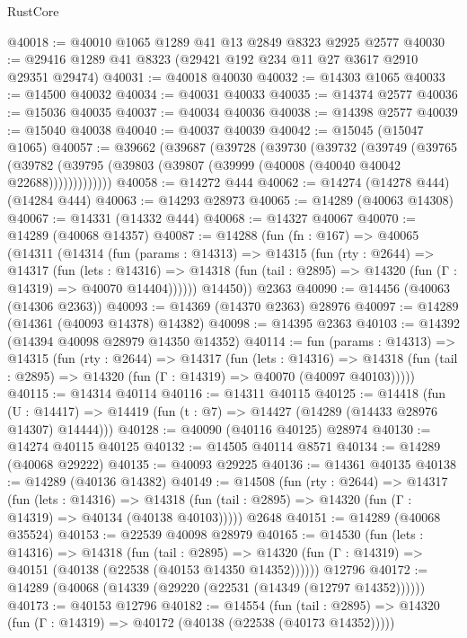 \begin{lexlean}{RustCore}
\begin{coremodule}
@40018 := @40010 @1065 @1289 @41 @13 @2849 @8323 @2925 @2577
@40030 := @29416 @1289 @41 @8323 (@29421 @192 @234 @11 @27 @3617 @2910 @29351 @29474)
@40031 := @40018 @40030
@40032 := @14303 @1065
@40033 := @14500 @40032
@40034 := @40031 @40033
@40035 := @14374 @2577
@40036 := @15036 @40035
@40037 := @40034 @40036
@40038 := @14398 @2577
@40039 := @15040 @40038
@40040 := @40037 @40039
@40042 := @15045 (@15047 @1065)
@40057 := @39662
    (@39687
      (@39728
        (@39730
          (@39732
            (@39749
              (@39765
                (@39782 (@39795 (@39803 (@39807 (@39999 (@40008 (@40040 @40042 @22688)))))))))))))
@40058 := @14272 @444
@40062 := @14274 (@14278 @444) (@14284 @444)
@40063 := @14293 @28973
@40065 := @14289 (@40063 @14308)
@40067 := @14331 (@14332 @444)
@40068 := @14327 @40067
@40070 := @14289 (@40068 @14357)
@40087 := @14288
    (fun (fn : @167) =>
    @40065
      (@14311
        (@14314
          (fun (params : @14313) =>
          @14315
            (fun (rty : @2644) =>
            @14317
              (fun (lets : @14316) =>
              @14318 (fun (tail : @2895) => @14320 (fun (Γ : @14319) => @40070 @14404))))))
        @14450))
    @2363
@40090 := @14456 (@40063 (@14306 @2363))
@40093 := @14369 (@14370 @2363) @28976
@40097 := @14289 (@14361 (@40093 @14378) @14382)
@40098 := @14395 @2363
@40103 := @14392 (@14394 @40098 @28979 @14350 @14352)
@40114 := fun (params : @14313) =>
  @14315
    (fun (rty : @2644) =>
    @14317
      (fun (lets : @14316) =>
      @14318 (fun (tail : @2895) => @14320 (fun (Γ : @14319) => @40070 (@40097 @40103)))))
@40115 := @14314 @40114
@40116 := @14311 @40115
@40125 := @14418
    (fun (U : @14417) => @14419 (fun (t : @7) => @14427 (@14289 (@14433 @28976 @14307) @14444)))
@40128 := @40090 (@40116 @40125) @28974
@40130 := @14274 @40115 @40125
@40132 := @14505 @40114 @8571
@40134 := @14289 (@40068 @29222)
@40135 := @40093 @29225
@40136 := @14361 @40135
@40138 := @14289 (@40136 @14382)
@40149 := @14508
    (fun (rty : @2644) =>
    @14317
      (fun (lets : @14316) =>
      @14318 (fun (tail : @2895) => @14320 (fun (Γ : @14319) => @40134 (@40138 @40103)))))
    @2648
@40151 := @14289 (@40068 @35524)
@40153 := @22539 @40098 @28979
@40165 := @14530
    (fun (lets : @14316) =>
    @14318
      (fun (tail : @2895) =>
      @14320 (fun (Γ : @14319) => @40151 (@40138 (@22538 (@40153 @14350 @14352))))))
    @12796
@40172 := @14289 (@40068 (@14339 (@29220 (@22531 (@14349 (@12797 @14352))))))
@40173 := @40153 @12796
@40182 := @14554
    (fun (tail : @2895) => @14320 (fun (Γ : @14319) => @40172 (@40138 (@22538 (@40173 @14352)))))

\end{coremodule}
\end{lexlean}
